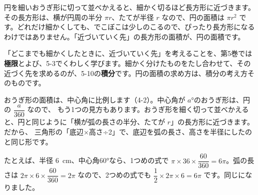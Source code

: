 円を細いおうぎ形に切って並べかえると、細かく切るほど長方形に近づきます。その長方形は、横が円周の半分 $\pi r$、たてが半径 $r$ なので、円の面積は $\pi r^2$ です。どれだけ細かくしても、でこぼこは少しのこるので、ぴったり長方形になるわけではありません。「近づいていく先」の長方形の面積が、円の面積です。

\begin{seikaku}
「どこまでも細かくしたときに、近づいていく先」を考えることを、第5巻では\textbf{極限}とよび、5-3でくわしく学びます。細かく分けたものをたし合わせて、その近づく先を求めるのが、5-10の\textbf{積分}です。円の面積の求め方は、積分の考え方そのものです。
\end{seikaku}

\noindent\begin{minipage}[c]{0.6\linewidth}
おうぎ形の面積は、中心角に比例します（4-2）。中心角が $a$°のおうぎ形は、円の $\dfrac{a}{360}$ なので、
もう1つの見方もあります。おうぎ形を細く切って並べかえると、円と同じように「横が弧の長さの半分、たてが $r$」の長方形に近づきます。だから、
三角形の「底辺×高さ÷2」で、底辺を弧の長さ、高さを半径にしたのと同じ形です。
\end{minipage}\hfill
\begin{minipage}[c]{0.36\linewidth}\centering
{}
\end{minipage}

\vspace{3pt}
たとえば、半径 \qty{6}{cm}、中心角60°なら、1つめの式で $\pi\times36\times\dfrac{60}{360}=6\pi$。弧の長さは $2\pi\times6\times\dfrac{60}{360}=2\pi$ なので、2つめの式でも $\dfrac{1}{2}\times2\pi\times6=6\pi$ です。同じになりました。

